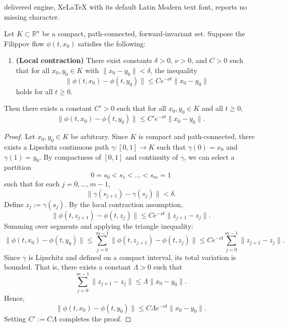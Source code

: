 \documentclass[10pt,a4paper]{amsart}
\begin{document}
delivered engine, XeLaTeX with its default Latin Modern text font, reports no missing character.
\begin{lemma}\label{lem:local_to_global_contraction}
	Let \( K \subset \mathbb{R}^n \) be a compact, path-connected, forward-invariant set. Suppose the Filippov flow \( \phi(t,x_0) \) satisfies the following:
	
	\begin{enumerate}
		\item[(i)] \textbf{(Local contraction)} There exist constants \( \delta > 0 \), \( \nu > 0 \), and \( C > 0 \) such that for all \( x_0, y_0 \in K \) with \( \|x_0 - y_0\| < \delta \), the inequality
		\[
		\|\phi(t, x_0) - \phi(t, y_0)\| \leq C e^{-\nu t} \|x_0 - y_0\|
		\]
		holds for all \( t \geq 0 \).
	\end{enumerate}
	
	Then there exists a constant \( C' > 0 \) such that for all \( x_0, y_0 \in K \) and all \( t \geq 0 \),
	\[
	\|\phi(t, x_0) - \phi(t, y_0)\| \leq C' e^{-\nu t} \|x_0 - y_0\|.
	\]
\end{lemma}

\begin{proof}
	Let \( x_0, y_0 \in K \) be arbitrary. Since \( K \) is compact and path-connected, there exists a Lipschitz continuous path \( \gamma : [0,1] \to K \) such that \( \gamma(0) = x_0 \) and \( \gamma(1) = y_0 \). By compactness of \( [0,1] \) and continuity of \( \gamma \), we can select a partition
	\[
	0 = s_0 < s_1 < \dots < s_m = 1
	\]
	such that for each \( j = 0, \dots, m-1 \),
	\[
	\| \gamma(s_{j+1}) - \gamma(s_j) \| < \delta.
	\]
	Define \( z_j := \gamma(s_j) \). By the local contraction assumption,
	\[
	\|\phi(t, z_{j+1}) - \phi(t, z_j)\| \leq C e^{-\nu t} \|z_{j+1} - z_j\|.
	\]
	Summing over segments and applying the triangle inequality:
	\[
	\|\phi(t, x_0) - \phi(t, y_0)\| \leq \sum_{j=0}^{m-1} \|\phi(t, z_{j+1}) - \phi(t, z_j)\| \leq C e^{-\nu t} \sum_{j=0}^{m-1} \|z_{j+1} - z_j\|.
	\]
	Since \( \gamma \) is Lipschitz and defined on a compact interval, its total variation is bounded. That is, there exists a constant \( \Lambda > 0 \) such that
	\[
	\sum_{j=0}^{m-1} \|z_{j+1} - z_j\| \leq \Lambda \|x_0 - y_0\|.
	\]
	Hence,
	\[
	\|\phi(t, x_0) - \phi(t, y_0)\| \leq C \Lambda e^{-\nu t} \|x_0 - y_0\|.
	\]
	Setting \( C' := C \Lambda \) completes the proof.
\end{proof}
\end{document}
